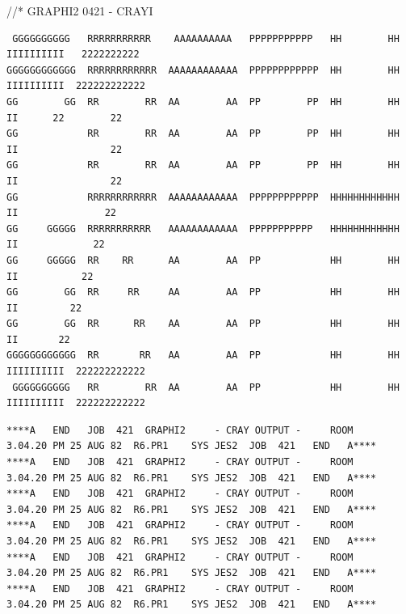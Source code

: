 
{\ttfamily //* \quad GRAPHI2 0421 \quad - CRAYI}

{\fontsize{4}{5}\selectfont
\begin{verbatim}
 GGGGGGGGGG   RRRRRRRRRRR    AAAAAAAAAA   PPPPPPPPPPP   HH        HH  IIIIIIIIII   2222222222
GGGGGGGGGGGG  RRRRRRRRRRRR  AAAAAAAAAAAA  PPPPPPPPPPPP  HH        HH  IIIIIIIIII  222222222222
GG        GG  RR        RR  AA        AA  PP        PP  HH        HH      II      22        22
GG            RR        RR  AA        AA  PP        PP  HH        HH      II                22
GG            RR        RR  AA        AA  PP        PP  HH        HH      II                22
GG            RRRRRRRRRRRR  AAAAAAAAAAAA  PPPPPPPPPPPP  HHHHHHHHHHHH      II               22
GG     GGGGG  RRRRRRRRRRR   AAAAAAAAAAAA  PPPPPPPPPPP   HHHHHHHHHHHH      II             22
GG     GGGGG  RR    RR      AA        AA  PP            HH        HH      II           22
GG        GG  RR     RR     AA        AA  PP            HH        HH      II         22
GG        GG  RR      RR    AA        AA  PP            HH        HH      II       22
GGGGGGGGGGGG  RR       RR   AA        AA  PP            HH        HH  IIIIIIIIII  222222222222
 GGGGGGGGGG   RR        RR  AA        AA  PP            HH        HH  IIIIIIIIII  222222222222
\end{verbatim}
}

{\fontsize{4}{5}\selectfont
\begin{verbatim}
****A   END   JOB  421  GRAPHI2     - CRAY OUTPUT -     ROOM        3.04.20 PM 25 AUG 82  R6.PR1    SYS JES2  JOB  421   END   A****
****A   END   JOB  421  GRAPHI2     - CRAY OUTPUT -     ROOM        3.04.20 PM 25 AUG 82  R6.PR1    SYS JES2  JOB  421   END   A****
****A   END   JOB  421  GRAPHI2     - CRAY OUTPUT -     ROOM        3.04.20 PM 25 AUG 82  R6.PR1    SYS JES2  JOB  421   END   A****
****A   END   JOB  421  GRAPHI2     - CRAY OUTPUT -     ROOM        3.04.20 PM 25 AUG 82  R6.PR1    SYS JES2  JOB  421   END   A****
****A   END   JOB  421  GRAPHI2     - CRAY OUTPUT -     ROOM        3.04.20 PM 25 AUG 82  R6.PR1    SYS JES2  JOB  421   END   A****
****A   END   JOB  421  GRAPHI2     - CRAY OUTPUT -     ROOM        3.04.20 PM 25 AUG 82  R6.PR1    SYS JES2  JOB  421   END   A****
\end{verbatim}
}


